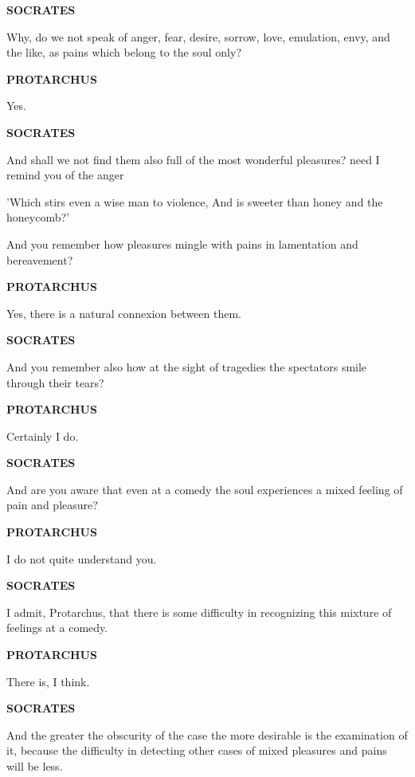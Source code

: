 \documentclass[11pt,letter]{article}
\begin{document}
\par \textbf{SOCRATES}
\par   Why, do we not speak of anger, fear, desire, sorrow, love, emulation, envy, and the like, as pains which belong to the soul only?

\par \textbf{PROTARCHUS}
\par   Yes.

\par \textbf{SOCRATES}
\par   And shall we not find them also full of the most wonderful pleasures? need I remind you of the anger

\par  'Which stirs even a wise man to violence, And is sweeter than honey and the honeycomb?'

\par  And you remember how pleasures mingle with pains in lamentation and bereavement?

\par \textbf{PROTARCHUS}
\par   Yes, there is a natural connexion between them.

\par \textbf{SOCRATES}
\par   And you remember also how at the sight of tragedies the spectators smile through their tears?

\par \textbf{PROTARCHUS}
\par   Certainly I do.

\par \textbf{SOCRATES}
\par   And are you aware that even at a comedy the soul experiences a mixed feeling of pain and pleasure?

\par \textbf{PROTARCHUS}
\par   I do not quite understand you.

\par \textbf{SOCRATES}
\par   I admit, Protarchus, that there is some difficulty in recognizing this mixture of feelings at a comedy.

\par \textbf{PROTARCHUS}
\par   There is, I think.

\par \textbf{SOCRATES}
\par   And the greater the obscurity of the case the more desirable is the examination of it, because the difficulty in detecting other cases of mixed pleasures and pains will be less.
\end{document}
